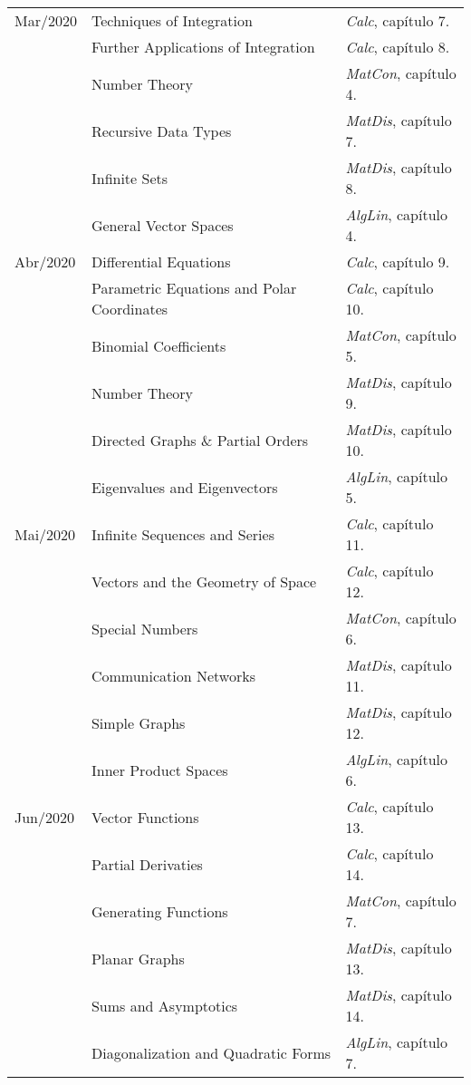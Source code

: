 \documentclass[a4paper]{inzane_syllabus} %
\begin{document}
\begin{center}
\begin{tabularx}{\textwidth}{p{2cm}p{8cm}p{9.5cm}}
\arrayrulecolor{maingray}\hline
Mar/2020 & Techniques of Integration            & \emph{Calc},   capítulo 7. \\
         & Further Applications of Integration  & \emph{Calc},   capítulo 8. \\
         & Number Theory                        & \emph{MatCon}, capítulo 4. \\
         & Recursive Data Types                 & \emph{MatDis}, capítulo 7. \\
         & Infinite Sets                        & \emph{MatDis}, capítulo 8. \\
         & General Vector Spaces                & \emph{AlgLin}, capítulo 4. \\

\arrayrulecolor{maingray}\hline
Abr/2020 & Differential Equations                      & \emph{Calc},   capítulo 9.  \\
         & Parametric Equations and Polar Coordinates  & \emph{Calc},   capítulo 10. \\
         & Binomial Coefficients                       & \emph{MatCon}, capítulo 5.  \\
         & Number Theory                               & \emph{MatDis}, capítulo 9.  \\
         & Directed Graphs \& Partial Orders           & \emph{MatDis}, capítulo 10. \\
         & Eigenvalues and Eigenvectors                & \emph{AlgLin}, capítulo 5.  \\

\arrayrulecolor{maingray}\hline
Mai/2020 & Infinite Sequences and Series      & \emph{Calc},   capítulo 11. \\
         & Vectors and the Geometry of Space  & \emph{Calc},   capítulo 12. \\
         & Special Numbers                    & \emph{MatCon}, capítulo 6.  \\
         & Communication Networks             & \emph{MatDis}, capítulo 11. \\
         & Simple Graphs                      & \emph{MatDis}, capítulo 12. \\
         & Inner Product Spaces               & \emph{AlgLin}, capítulo 6.  \\

\arrayrulecolor{maingray}\hline
Jun/2020 & Vector Functions                     & \emph{Calc},   capítulo 13. \\
         & Partial Derivaties                   & \emph{Calc},   capítulo 14. \\
         & Generating Functions                 & \emph{MatCon}, capítulo 7.  \\
         & Planar Graphs                        & \emph{MatDis}, capítulo 13. \\
         & Sums and Asymptotics                 & \emph{MatDis}, capítulo 14. \\
         & Diagonalization and Quadratic Forms  & \emph{AlgLin}, capítulo 7.  \\


\end{tabularx}
\end{center}
\end{document}
